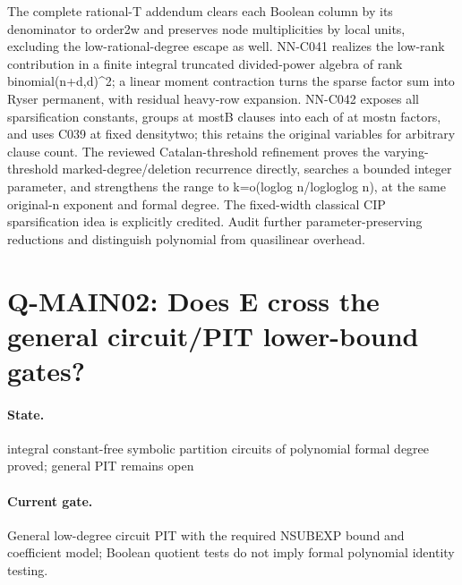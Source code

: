 The complete rational-T addendum clears each Boolean column by its denominator to order2w and preserves node multiplicities by local units, excluding the low-rational-degree escape as well. NN-C041 realizes the low-rank contribution in a finite integral truncated divided-power algebra of rank binomial(n+d,d)\textasciicircum{}2; a linear moment contraction turns the sparse factor sum into Ryser permanent, with residual heavy-row expansion. NN-C042 exposes all sparsification constants, groups at mostB clauses into each of at mostn factors, and uses C039 at fixed densitytwo; this retains the original variables for arbitrary clause count. The reviewed Catalan-threshold refinement proves the varying-threshold marked-degree/deletion recurrence directly, searches a bounded integer parameter, and strengthens the range to k=o(loglog n/logloglog n), at the same original-n exponent and formal degree. The fixed-width classical CIP sparsification idea is explicitly credited. Audit further parameter-preserving reductions and distinguish polynomial from quasilinear overhead.

\section{Q-MAIN02: Does E cross the general circuit/PIT lower-bound gates?}
\paragraph{State.} integral constant-free symbolic partition circuits of polynomial formal degree proved; general PIT remains open
\paragraph{Current gate.} General low-degree circuit PIT with the required NSUBEXP bound and coefficient model; Boolean quotient tests do not imply formal polynomial identity testing.
